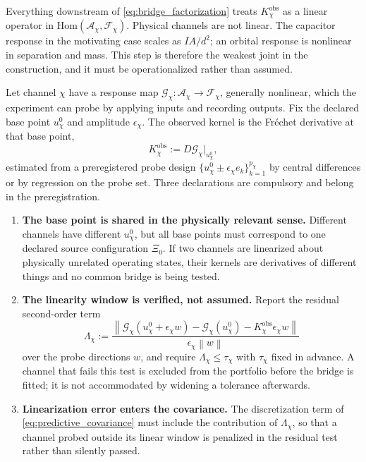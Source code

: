\documentclass[11pt]{article}
\newcommand{\norm}[1]{\left\lVert #1\right\rVert}
\begin{document}
Everything downstream of \cref{eq:bridge_factorization} treats \(K_{\chi}^{\mathrm{obs}}\) as a linear operator in \(\mathrm{Hom}(\mathcal A_{\chi},\mathcal F_{\chi})\). Physical channels are not linear. The capacitor response in the motivating case scales as \(IA/d^{2}\); an orbital response is nonlinear in separation and mass. This step is therefore the weakest joint in the construction, and it must be operationalized rather than assumed.

Let channel \(\chi\) have a response map \(\mathcal G_{\chi}:\mathcal A_{\chi}\to\mathcal F_{\chi}\), generally nonlinear, which the experiment can probe by applying inputs and recording outputs. Fix the declared base point \(u_{\chi}^{0}\) and amplitude \(\epsilon_{\chi}\). The observed kernel is the Fr\'echet derivative at that base point,
\begin{equation}
K_{\chi}^{\mathrm{obs}}
:=D\mathcal G_{\chi}\big|_{u_{\chi}^{0}},
\label{eq:observed_kernel_definition}
\end{equation}
estimated from a preregistered probe design \(\{u_{\chi}^{0}\pm\epsilon_{\chi}e_{k}\}_{k=1}^{p_{\chi}}\) by central differences or by regression on the probe set. Three declarations are compulsory and belong in the preregistration.

\begin{enumerate}[leftmargin=1.55em]
\item \textbf{The base point is shared in the physically relevant sense.} Different channels have different \(u_{\chi}^{0}\), but all base points must correspond to one declared source configuration \(\Xi_{0}\). If two channels are linearized about physically unrelated operating states, their kernels are derivatives of different things and no common bridge is being tested.
\item \textbf{The linearity window is verified, not assumed.} Report the residual second-order term
\begin{equation}
\Lambda_{\chi}
:=\frac{
\norm{\mathcal G_{\chi}(u^{0}_{\chi}+\epsilon_{\chi}w)
-\mathcal G_{\chi}(u^{0}_{\chi})
-K_{\chi}^{\mathrm{obs}}\epsilon_{\chi}w}
}{\epsilon_{\chi}\norm{w}}
\label{eq:linearity_residual}
\end{equation}
over the probe directions \(w\), and require \(\Lambda_{\chi}\le\tau_{\chi}\) with \(\tau_{\chi}\) fixed in advance. A channel that fails this test is excluded from the portfolio before the bridge is fitted; it is not accommodated by widening a tolerance afterwards.
\item \textbf{Linearization error enters the covariance.} The discretization term of \cref{eq:predictive_covariance} must include the contribution of \(\Lambda_{\chi}\), so that a channel probed outside its linear window is penalized in the residual test rather than silently passed.
\end{enumerate}
\end{document}
